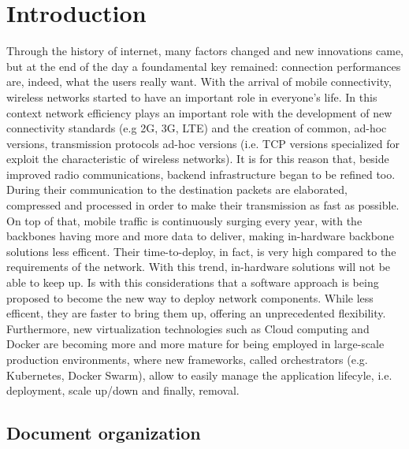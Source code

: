  
\chapter{Introduction}
\label{chap:intro}

 Through the history of internet, many factors changed and new innovations came,
 but at the end of the day a foundamental key remained: connection performances
 are, indeed, what the users really want.
With the arrival of mobile connectivity, wireless networks started to have an 
important role in everyone's life. In this context network efficiency plays 
an important role with the development of new connectivity standards (e.g 2G, 
3G, LTE) and the creation of common, ad-hoc versions, transmission protocols 
ad-hoc versions (i.e. TCP versions specialized for exploit the characteristic of 
wireless networks). It is for this reason that, beside improved radio 
communications, backend infrastructure began to be refined too. During their 
communication to the destination packets are elaborated, compressed and 
processed in order to make their transmission as fast as possible.
On top of that, mobile traffic is continuously surging every year, with the 
backbones having more and more data to deliver, making in-hardware backbone 
solutions less efficent. Their time-to-deploy, in fact, is very high compared 
to the requirements of the network. With this trend, in-hardware solutions 
will not be able to keep up. Is with this considerations that a 
software approach is being proposed to become the new way to deploy network 
components. While less efficent, they are faster to bring them up, offering an 
unprecedented flexibility.
 Furthermore, new virtualization technologies such as Cloud computing and Docker
 are becoming more and more mature for being employed in large-scale production
 environments, where new frameworks, called orchestrators (e.g. Kubernetes,
 Docker Swarm), allow to easily manage the application lifecyle, i.e.
 deployment, scale up/down and finally, removal.
 
 \section{Document organization}
 
